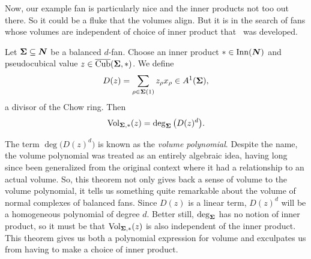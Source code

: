 \documentclass[12pt,oneside]{../../sfsuthesis}
\begin{document}
\begin{figure}[H]
\begin{subfigure}{0.48\textwidth}
    \end{subfigure}
\end{figure}
Now, our example fan is particularly nice and the inner products not too out there.
So it could be a fluke that the volumes align.
But it is in the search of fans whose volumes are independent of choice of inner product that~\cite[Theorem~6.3]{nathansonTropicalFansNormal2023} was developed.
\begin{theorem}\th\label{thm:volDegCorrespondence}
    Let \( {\bm{\Sigma}} \subseteq \bm{N} \) be a balanced \( d \)-fan.
    Choose an inner product \( \ast \in \operatorname{Inn}(\bm{N}) \) and pseudocubical value \( z  \in \operatorname{\overline{Cub}}( {\bm{\Sigma}}, \ast ) \).
    We define
    \[
        D(z) = \sum_{\rho \in {\bm{\Sigma}}(1)} z_\rho x_\rho \in A^1({\bm{\Sigma}}),
    \]
    a divisor of the Chow ring.
    Then
    \[
        \operatorname{Vol}_{{\bm{\Sigma}}, \ast}(z) = \deg_{{\bm{\Sigma}}}\big( D(z)^d \big).
    \]
\end{theorem}
The term \( \deg\big( D(z)^d \big) \) is known as the \emph{volume polynomial}.
Despite the name, the volume polynomial was treated as an entirely algebraic idea, having long since been generalized from the original context where it had a relationship to an actual volume.
So, this theorem not only gives back a sense of volume to the volume polynomial, it tells us something quite remarkable about the volume of normal complexes of balanced fans.
Since \( D(z) \) is a linear term, \(  D(z)^d \) will be a homogeneous polynomial of degree \( d \).
Better still, \( \deg_{{\bm{\Sigma}}} \) has no notion of inner product, so it must be that \(  \operatorname{Vol}_{{\bm{\Sigma}}, \ast}(z) \) is also independent of the inner product.
This theorem gives us both a polynomial expression for volume and exculpates us from having to make a choice of inner product.
\end{document}

